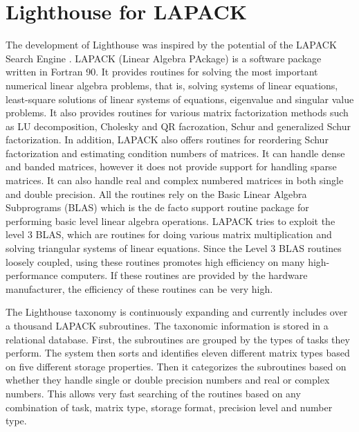 \section{Lighthouse for LAPACK}
The development of Lighthouse was inspired by the potential of the LAPACK Search Engine \cite{lapacksearch}. LAPACK (Linear Algebra PAckage) is a software package written in Fortran 90. It provides routines for solving the most important numerical linear algebra problems, that is, solving systems of linear equations, least-square solutions of linear systems of equations, eigenvalue and singular value problems. It also provides routines for various matrix factorization methods such as LU decomposition, Cholesky and QR facrozation, Schur and generalized Schur factorization. In addition, LAPACK also offers routines for reordering Schur factorization and estimating condition numbers of matrices. It can handle dense and banded matrices, however it does not provide support for handling sparse matrices. It can also handle real and complex numbered matrices in both single and double precision. All the routines rely on the Basic Linear Algebra Subprograms (BLAS) which is the de facto support routine package for performing basic level linear algebra operations. LAPACK tries to exploit the level 3 BLAS, which are routines for doing various matrix multiplication and solving triangular systems of linear equations. Since the Level 3 BLAS routines loosely coupled, using these routines promotes high efficiency on many high-performance computers. If these routines are provided by the hardware manufacturer, the efficiency of these routines can be very high.  

The Lighthouse taxonomy is continuously expanding and currently includes over a thousand LAPACK subroutines. The taxonomic information is stored in a relational database. First, the subroutines are grouped by the types of tasks they perform. The system then sorts and identifies eleven different matrix types based on five different storage properties. Then it categorizes the subroutines based on whether they handle single or double precision numbers and real or complex numbers. This allows very fast searching of the routines based on any combination of task, matrix type, storage format, precision level and number type.

